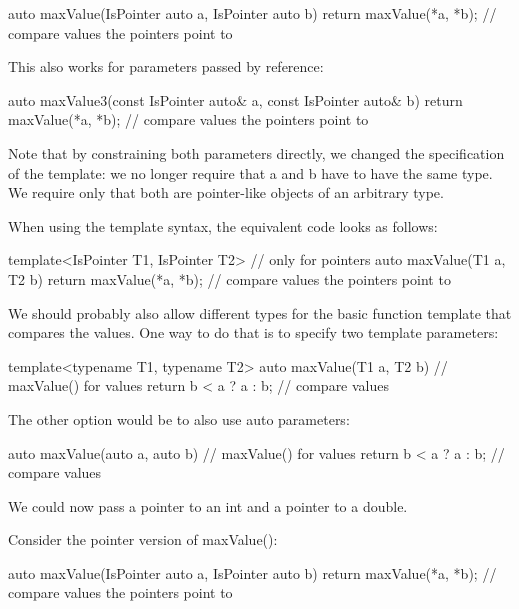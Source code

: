 \begin{cpp}
auto maxValue(IsPointer auto a, IsPointer auto b)
{
	return maxValue(*a, *b); // compare values the pointers point to
}
\end{cpp}

This also works for parameters passed by reference:

\begin{cpp}
auto maxValue3(const IsPointer auto& a, const IsPointer auto& b)
{
	return maxValue(*a, *b); // compare values the pointers point to
}
\end{cpp}

Note that by constraining both parameters directly, we changed the specification of the template: we no longer require that a and b have to have the same type. We require only that both are pointer-like objects of an arbitrary type.

When using the template syntax, the equivalent code looks as follows:

\begin{cpp}
template<IsPointer T1, IsPointer T2> // only for pointers
auto maxValue(T1 a, T2 b)
{
	return maxValue(*a, *b); // compare values the pointers point to
}
\end{cpp}

We should probably also allow different types for the basic function template that compares the values. One way to do that is to specify two template parameters:

\begin{cpp}
template<typename T1, typename T2>
auto maxValue(T1 a, T2 b) // maxValue() for values
{
	return b < a ? a : b; // compare values
}
\end{cpp}

The other option would be to also use auto parameters:

\begin{cpp}
auto maxValue(auto a, auto b) // maxValue() for values
{
	return b < a ? a : b; // compare values
}
\end{cpp}

We could now pass a pointer to an int and a pointer to a double.


Consider the pointer version of maxValue():

\begin{cpp}
auto maxValue(IsPointer auto a, IsPointer auto b)
{
	return maxValue(*a, *b); // compare values the pointers point to
}
\end{cpp}

